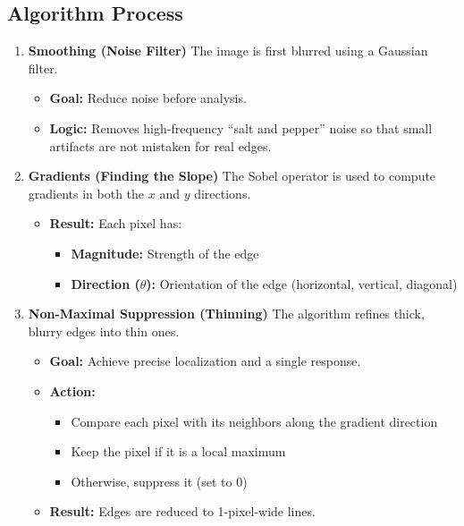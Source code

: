 \documentclass[12pt]{article}
\begin{document}
\subsection{Algorithm Process}
\begin{enumerate}
    \item \textbf{Smoothing (Noise Filter)}
          The image is first blurred using a Gaussian filter.
          \begin{itemize}
              \item \textbf{Goal:} Reduce noise before analysis.
              \item \textbf{Logic:} Removes high-frequency ``salt and pepper'' noise so that small artifacts are not mistaken for real edges.
          \end{itemize}

    \item \textbf{Gradients (Finding the Slope)}
          The Sobel operator is used to compute gradients in both the $x$ and $y$ directions.
          \begin{itemize}
              \item \textbf{Result:} Each pixel has:
                    \begin{itemize}
                        \item \textbf{Magnitude:} Strength of the edge
                        \item \textbf{Direction ($\theta$):} Orientation of the edge (horizontal, vertical, diagonal)
                    \end{itemize}
          \end{itemize}

    \item \textbf{Non-Maximal Suppression (Thinning)}
          The algorithm refines thick, blurry edges into thin ones.
          \begin{itemize}
              \item \textbf{Goal:} Achieve precise localization and a single response.
              \item \textbf{Action:}
                    \begin{itemize}
                        \item Compare each pixel with its neighbors along the gradient direction
                        \item Keep the pixel if it is a local maximum
                        \item Otherwise, suppress it (set to 0)
                    \end{itemize}
              \item \textbf{Result:} Edges are reduced to 1-pixel-wide lines.
          \end{itemize}


\end{enumerate}
\end{document}
